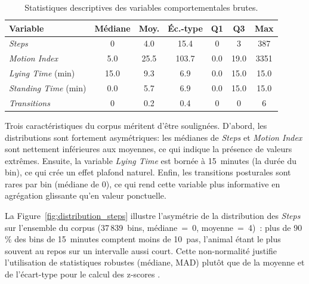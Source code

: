 \begin{table}[H]
    \centering
    \caption{Statistiques descriptives des variables comportementales brutes.}
    \label{tab:stats_descriptives}
    \begin{tabular}{lcccccc}
        \toprule
        \textbf{Variable} & \textbf{Médiane} & \textbf{Moy.} & \textbf{Éc.-type}
            & \textbf{Q1} & \textbf{Q3} & \textbf{Max} \\
        \midrule
        \textit{Steps}              & 0     & 4.0   & 15.4  & 0     & 3     & 387 \\
        \textit{Motion Index}       & 5.0   & 25.5  & 103.7 & 0.0   & 19.0  & 3351 \\
        \textit{Lying Time} (min)   & 15.0  & 9.3   & 6.9   & 0.0   & 15.0  & 15.0 \\
        \textit{Standing Time} (min)& 0.0   & 5.7   & 6.9   & 0.0   & 15.0  & 15.0 \\
        \textit{Transitions}        & 0     & 0.2   & 0.4   & 0     & 0     & 6 \\
        \bottomrule
    \end{tabular}
\end{table}

Trois caractéristiques du corpus méritent d'être soulignées. D'abord, les distributions
sont fortement asymétriques: les médianes de \textit{Steps} et \textit{Motion Index} sont nettement
inférieures aux moyennes, ce qui indique la présence de valeurs extrêmes. Ensuite, la
variable \textit{Lying Time} est bornée à 15~minutes (la durée du bin), ce qui crée un effet plafond
naturel. Enfin, les transitions posturales sont rares par bin (médiane de 0), ce qui rend
cette variable plus informative en agrégation glissante qu'en valeur ponctuelle.

La Figure~\ref{fig:distribution_steps} illustre l'asymétrie de la distribution des \textit{Steps}
sur l'ensemble du corpus (37\,839~bins, médiane~=~0, moyenne~=~4)~: plus de 90\,\% des bins
de 15~minutes comptent moins de 10~pas, l'animal étant le plus souvent au repos sur un
intervalle aussi court. Cette non-normalité
justifie l'utilisation de statistiques robustes (médiane, MAD) plutôt que de la moyenne
et de l'écart-type pour le calcul des z-scores \citep{leys2013detecting}.

